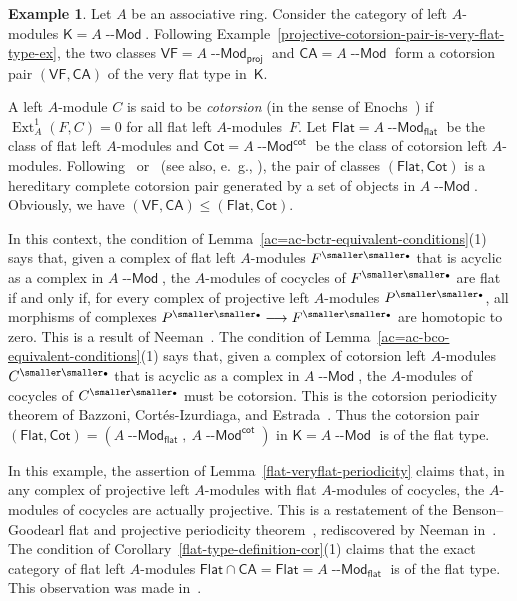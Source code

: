 \documentclass[12pt,a4paper]{amsart}
\newcommand{\+}{\nobreakdash-}
\renewcommand{\:}{\colon}
\newcommand{\rarrow}{\longrightarrow}
\newcommand{\bu}{{\text{\smaller\smaller$\scriptstyle\bullet$}}}
\DeclareMathOperator{\Ext}{Ext}
\newcommand{\Modl}{{\operatorname{\mathsf{--Mod}}}}
\newcommand{\sK}{\mathsf K}
\newcommand{\VF}{\mathsf{VF}}
\newcommand{\CA}{\mathsf{CA}}
\newcommand{\Flat}{\mathsf{Flat}}
\newcommand{\Cot}{\mathsf{Cot}}
\newcommand{\proj}{\mathsf{proj}}
\renewcommand{\flat}{\mathsf{flat}}
\renewcommand{\cot}{\mathsf{cot}}
\theoremstyle{plain}
\theoremstyle{definition}
\newtheorem{ex}[thm]{Example}
\begin{document}
\begin{ex} \label{flat-cotorsion-pair-in-modules-flat-type}
 Let $A$ be an associative ring.
 Consider the category of left $A$\+modules $\sK=A\Modl$.
 Following Example~\ref{projective-cotorsion-pair-is-very-flat-type-ex},
the two classes $\VF=A\Modl_\proj$ and $\CA=A\Modl$ form a cotorsion
pair $(\VF,\CA)$ of the very flat type in~$\sK$.

 A left $A$\+module $C$ is said to be \emph{cotorsion} (in the sense
of Enochs~\cite[Section~2]{En2}) if $\Ext^1_A(F,C)=0$ for all flat
left $A$\+modules~$F$.
 Let $\Flat=A\Modl_\flat$ be the class of flat left $A$\+modules
and $\Cot=A\Modl^\cot$ be the class of cotorsion left $A$\+modules.
 Following~\cite[Section~2]{BBE} or~\cite[Theorem~6.19]{GT} (see also,
e.~g., \cite[Section~4.3]{Pphil}), the pair of classes $(\Flat,\Cot)$
is a hereditary complete cotorsion pair generated by a set of objects
in $A\Modl$.
 Obviously, we have $(\VF,\CA)\le(\Flat,\Cot)$.

 In this context, the condition of
Lemma~\ref{ac=ac-bctr-equivalent-conditions}(1) says that, given
a complex of flat left $A$\+modules $F^\bu$ that is acyclic as a complex
in $A\Modl$, the $A$\+modules of cocycles of $F^\bu$ are flat if and
only if, for every complex of projective left $A$\+modules $P^\bu$,
all morphisms of complexes $P^\bu\rarrow F^\bu$ are homotopic to zero.
 This is a result
of Neeman~\cite[Theorem~8.6\,(i)\,$\Leftrightarrow$\,(iii)]{Neem}.
 The condition of
Lemma~\ref{ac=ac-bco-equivalent-conditions}(1) says that, given
a complex of cotorsion left $A$\+modules $C^\bu$ that is acyclic as
a complex in $A\Modl$, the $A$\+modules of cocycles of $C^\bu$ must be
cotorsion.
 This is the cotorsion periodicity theorem of Bazzoni,
Cort\'es-Izurdiaga, and Estrada~\cite[Theorem~1.2(2),
Proposition~4.8(2), or Theorem~5.1(2)]{BCE}.
 Thus the cotorsion pair $(\Flat,\Cot)=(A\Modl_\flat,\>A\Modl^\cot)$
in $\sK=A\Modl$ is of the flat type.

 In this example, the assertion of Lemma~\ref{flat-veryflat-periodicity}
claims that, in any complex of projective left $A$\+modules with flat
$A$\+modules of cocycles, the $A$\+modules of cocycles are actually
projective.
 This is a restatement of the Benson--Goodearl flat and projective
periodicity theorem~\cite[Theorem~2.5]{BG}, rediscovered by
Neeman in~\cite[Remark~2.15]{Neem}.
 The condition of Corollary~\ref{flat-type-definition-cor}(1) claims
that the exact category of flat left $A$\+modules $\Flat\cap\CA=
\Flat=A\Modl_\flat$ is of the flat type.
 This observation was made in~\cite[Theorems~7.14 and~7.18]{Pphil}.


\end{ex}
\end{document}
